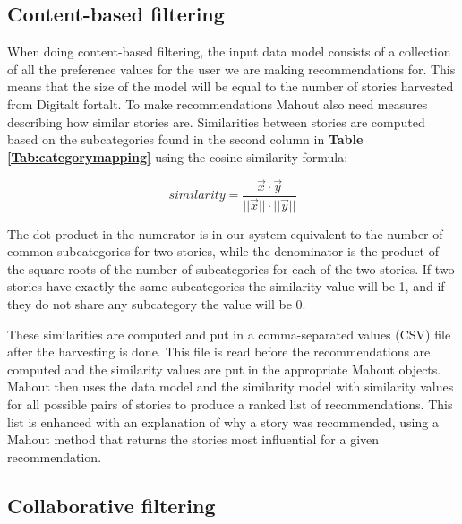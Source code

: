 \subsection{Content-based filtering}

When doing content-based filtering, the input data model consists of a collection of all the preference values for the user we are making recommendations for. This means that the size of the model will be equal to the number of stories harvested from Digitalt fortalt. To make recommendations Mahout also need measures describing how similar stories are. Similarities between stories are computed based on the subcategories found in the second column in \textbf{Table \ref{Tab:categorymapping}} using the cosine similarity formula: 

\begin{equation}
similarity = \frac{\vec{x}\cdot\vec{y}}{||\vec{x}||\cdot||\vec{y}||}
\end{equation}

The dot product in the numerator is in our system equivalent to the number of common subcategories for two stories, while the denominator is the product of the square roots of the number of subcategories for each of the two stories. If two stories have exactly the same subcategories the similarity value will be 1, and if they do not share any subcategory the value will be 0. \newline

These similarities are computed and put in a comma-separated values (CSV) file after the harvesting is done. This file is read before the recommendations are computed and the similarity values are put in the appropriate Mahout objects. Mahout then uses the data model and the similarity model with similarity values for all possible pairs of stories to produce a ranked list of recommendations. This list is enhanced with an explanation of why a story was recommended, using a Mahout method that returns the stories most influential for a given recommendation.


\subsection{Collaborative filtering}

